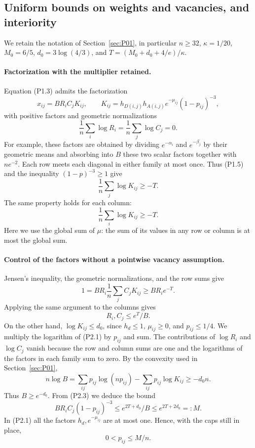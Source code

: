 \subsection{Uniform bounds on weights and vacancies, and interiority}\label{sec:P02}
We retain the notation of Section~\ref{sec:P01}, in particular
$n\ge32$, $\kappa=1/20$, $M_0=6/5$, $d_0=3\log(4/3)$, and
$T=(M_0+d_0+4/e)/\kappa$.

\paragraph{Factorization with the multiplier retained.}
Equation (P1.3) admits the factorization
\[
 x_{ij}=B R_i C_j K_{ij},\qquad
 K_{ij}=h_{D(i,j)}h_{A(i,j)}e^{-\mu_{ij}}(1-p_{ij})^{-3},
                                                               \tag{P2.1}
\]
with positive factors and geometric normalizations
\[
 \frac1n\sum_i\log R_i=\frac1n\sum_j\log C_j=0.
\]
For example, these factors are obtained by dividing $e^{-\alpha_i}$ and
$e^{-\beta_j}$ by their geometric means and absorbing into $B$
these two scalar factors together with $ne^{-2}$.
Each row meets each diagonal in either family at most once.
Thus (P1.5) and the inequality $(1-p)^{-3}\ge1$ give
\[
 \frac1n\sum_j\log K_{ij}\ge-T.
\]
The same property holds for each column:
\[
 \frac1n\sum_i\log K_{ij}\ge-T.                  \tag{P2.2}
\]
Here we use the global sum of $\mu$: the sum of its values in any
row or column is at most the global sum.

\paragraph{Control of the factors without a pointwise vacancy assumption.}
Jensen's inequality, the geometric normalizations, and the row sums give
\[
 1=B R_i\frac1n\sum_j C_jK_{ij}\ge B R_i e^{-T}.
\]
Applying the same argument to the columns gives
\[
 R_i,C_j\le e^T/B.                               \tag{P2.3}
\]
On the other hand, $\log K_{ij}\le d_0$, since $h_d\le1$,
$\mu_{ij}\ge0$, and $p_{ij}\le1/4$.
We multiply the logarithm of (P2.1) by $p_{ij}$ and sum.
The contributions of $\log R_i$ and $\log C_j$ vanish because the
row and column sums are one and the logarithms of the factors in each family sum
to zero. By the convexity used in Section~\ref{sec:P01},
\[
 n\log B=\sum_{ij}p_{ij}\log(np_{ij})
               -\sum_{ij}p_{ij}\log K_{ij}\ge-d_0n.
\]
Thus $B\ge e^{-d_0}$. From (P2.3) we deduce the bound
\[
 B R_i C_j(1-p_{ij})^{-3}
 \le e^{2T+d_0}/B\le e^{2T+2d_0}=:M.             \tag{P2.4}
\]
In (P2.1) all the factors $h_d,e^{-\mu_{ij}}$ are at most
one. Hence, with the caps still in place,
\[
             0<p_{ij}\le M/n.                    \tag{P2.5}
\]

